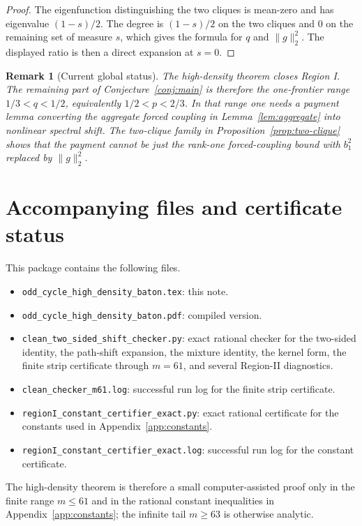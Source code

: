 \documentclass[11pt]{article}
\newtheorem{remark}[theorem]{Remark}
\newcommand{\norm}[1]{\lVert #1\rVert}
\begin{document}
\begin{proof}
The eigenfunction distinguishing the two cliques is mean-zero and has eigenvalue $(1-s)/2$.  The degree is $(1-s)/2$ on the two cliques and $0$ on the remaining set of measure $s$, which gives the formula for $q$ and $\norm g_2^2$.  The displayed ratio is then a direct expansion at $s=0$.
\end{proof}

\begin{remark}[Current global status]
The high-density theorem closes Region I.  The remaining part of Conjecture~\ref{conj:main} is therefore the one-frontier range $1/3<q<1/2$, equivalently $1/2<p<2/3$.  In that range one needs a payment lemma converting the aggregate forced coupling in Lemma~\ref{lem:aggregate} into nonlinear spectral shift.  The two-clique family in Proposition~\ref{prop:two-clique} shows that the payment cannot be just the rank-one forced-coupling bound with $b_1^2$ replaced by $\norm g_2^2$.
\end{remark}



\section{Accompanying files and certificate status}\label{sec:files}

This package contains the following files.
\begin{itemize}[leftmargin=2em]
\item \texttt{odd\_cycle\_high\_density\_baton.tex}: this note.
\item \texttt{odd\_cycle\_high\_density\_baton.pdf}: compiled version.
\item \texttt{clean\_two\_sided\_shift\_checker.py}: exact rational checker for the two-sided identity, the path-shift expansion, the mixture identity, the kernel form, the finite strip certificate through $m=61$, and several Region-II diagnostics.
\item \texttt{clean\_checker\_m61.log}: successful run log for the finite strip certificate.
\item \texttt{regionI\_constant\_certifier\_exact.py}: exact rational certificate for the constants used in Appendix~\ref{app:constants}.
\item \texttt{regionI\_constant\_certifier\_exact.log}: successful run log for the constant certificate.
\end{itemize}

The high-density theorem is therefore a small computer-assisted proof only in the finite range $m\le61$ and in the rational constant inequalities in Appendix~\ref{app:constants}; the infinite tail $m\ge63$ is otherwise analytic.
\end{document}
